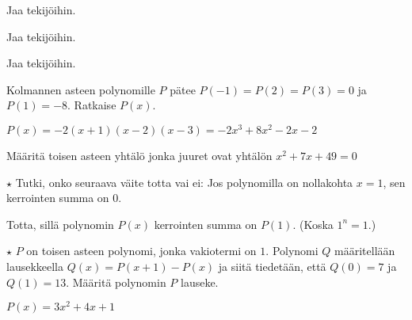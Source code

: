\begin{tehtavasivu}
\begin{tehtava}
	Jaa tekijöihin.
	\begin{vastaus}
	\end{vastaus}
\end{tehtava}

\begin{tehtava}
Jaa tekijöihin.
\begin{vastaus}
\end{vastaus}
\end{tehtava}

\begin{tehtava}
    Jaa tekijöihin.
    \begin{vastaus}
    \end{vastaus}
\end{tehtava}

\begin{tehtava}
    Kolmannen asteen polynomille $P$ pätee $P(-1)=P(2)=P(3)=0$ ja $P(1)=-8$. Ratkaise $P(x)$.
    \begin{vastaus}
        $P(x)=-2(x+1)(x-2)(x-3)=-2x^3+8x^2-2x-2$
    \end{vastaus}
\end{tehtava}

\begin{tehtava}
   Määritä toisen asteen yhtälö jonka juuret ovat yhtälön $ x^2+7x+49 =0$ 
    \begin{vastaus}
    \end{vastaus}
\end{tehtava}

\begin{tehtava}
    $\star $ Tutki, onko seuraava väite totta vai ei: Jos polynomilla on nollakohta $x=1$, sen kerrointen summa on $0$. 
    \begin{vastaus}
        Totta, sillä polynomin $P(x)$ kerrointen summa on $P(1)$. (Koska $1^n=1$.)
    \end{vastaus}
\end{tehtava}

\begin{tehtava}
    $\star$ $P$ on toisen asteen polynomi, jonka vakiotermi on $1$. Polynomi $Q$ määritellään lausekkeella $Q(x)=P(x+1)-P(x)$ ja siitä tiedetään, että $Q(0)=7$ ja $Q(1)=13$. Määritä polynomin $P$ lauseke.
    \begin{vastaus}
        $P(x) = 3x^2+4x+1$
    \end{vastaus}
\end{tehtava}

\end{tehtavasivu}